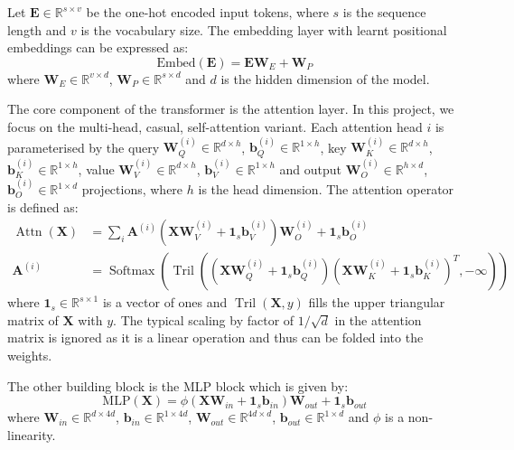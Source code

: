 \documentclass{article}
\renewcommand{\v}[1]{\mathbf{\bm{#1}}}
\newcommand{\m}[1]{\mathbf{\bm{#1}}}
\newcommand{\R}{\mathbb{R}}
\DeclareMathOperator{\softmax}{Softmax}
\DeclareMathOperator{\tril}{Tril}
\DeclareMathOperator{\attn}{Attn}
\begin{document}
Let $\m{E} \in \R^{s \times v}$ be the one-hot encoded input tokens, where $s$ is the sequence length and $v$ is the vocabulary size. The embedding layer with learnt positional embeddings can be expressed as:
\begin{equation}  \label{eq:embed}
    \text{Embed}(\m{E}) = \m{E} \m{W}_E + \m{W}_P
\end{equation}
where $\m{W}_E \in \R^{v \times d}$, $\m{W}_P \in \R^{s \times d}$ and $d$ is the hidden dimension of the model.

The core component of the transformer is the attention layer. In this project, we focus on the multi-head, casual, self-attention variant. Each attention head $i$ is parameterised by the query $\m{W}_Q^{(i)} \in \R^{d \times h}$, $\v{b}_Q^{(i)} \in \R^{1 \times h}$, key $\m{W}_K^{(i)} \in \R^{d \times h}$, $\v{b}_K^{(i)} \in \R^{1 \times h}$, value $\m{W}_V^{(i)} \in \R^{d \times h}$, $\v{b}_V^{(i)} \in \R^{1 \times h}$ and output $\m{W}_O^{(i)} \in \R^{h \times d}$, $\v{b}_O^{(i)} \in \R^{1 \times d}$ projections, where $h$ is the head dimension. The attention operator is defined as:
\begin{equation}  \label{eq:attn}
    \begin{aligned}
        \attn(\m{X})
         & = \sum_i \m{A}^{(i)} (\m{X} \m{W}_V^{(i)} + \v{1}_s \v{b}_V^{(i)}) \m{W}_O^{(i)} + \v{1}_s \v{b}_O^{(i)} \\
        \m{A}^{(i)}
         & = \softmax\left(
        \tril\left(
        \left(\m{X} \m{W}_Q^{(i)} + \v{1}_s \v{b}_Q^{(i)}\right)
        \left(\m{X} \m{W}_K^{(i)} + \v{1}_s \v{b}_K^{(i)}\right)^T
        , -\infty\right)
        \right)
    \end{aligned}
\end{equation}
where $\v{1}_s \in \R^{s \times 1}$ is a vector of ones and $\tril(\m{X}, y)$ fills the upper triangular matrix of $\m{X}$ with $y$. The typical scaling by factor of $1/\sqrt{d}$ in the attention matrix is ignored as it is a linear operation and thus can be folded into the weights.

The other building block is the MLP block which is given by:
\begin{equation*}
    \text{MLP}(\m{X}) = \phi(
    \m{X} \m{W}_{in} + \v{1}_s \m{b}_{in}
    ) \m{W}_{out} + \v{1}_s \m{b}_{out}
\end{equation*}
where $\m{W}_{in} \in \R^{d \times 4d}$, $\v{b}_{in} \in \R^{1 \times 4d}$, $\m{W}_{out} \in \R^{4d \times d}$, $\v{b}_{out} \in \R^{1 \times d}$ and $\phi$ is a non-linearity.
\end{document}
